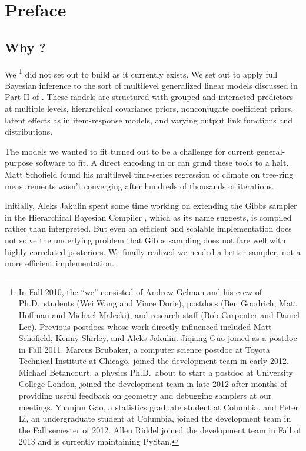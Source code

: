 \chapter*{Preface}

\section*{Why \Stan?}

We%
%
\footnote{In Fall 2010, the ``we'' consisted of Andrew Gelman and his
  crew of Ph.D.\ students (Wei Wang and Vince Dorie), postdocs (Ben
  Goodrich, Matt Hoffman and Michael Malecki), and research staff (Bob
  Carpenter and Daniel Lee).  Previous postdocs whose work directly
  influenced \Stan included Matt Schofield, Kenny Shirley, and Aleks
  Jakulin.  Jiqiang Guo joined as a postdoc in Fall 2011.  Marcus
  Brubaker, a computer science postdoc at Toyota Technical Institute
  at Chicago, joined the development team in early 2012.  Michael
  Betancourt, a physics Ph.D.\ about to start a postdoc at University
  College London, joined the development team in late 2012 after
  months of providing useful feedback on geometry and debugging
  samplers at our meetings. Yuanjun Gao, a statistics graduate student at
  Columbia, and Peter Li, an undergraduate student at Columbia,
  joined the development team in the Fall semester of 2012.  Allen
  Riddel joined the development team in Fall of 2013 and is currently
  maintaining PyStan.}
%
did not set out to build \Stan as it currently exists.  We set out to
apply full Bayesian inference to the sort of multilevel generalized
linear models discussed in Part II of \citep{GelmanHill:2007}.  These
models are structured with grouped and interacted predictors at
multiple levels, hierarchical covariance priors, nonconjugate
coefficient priors, latent effects as in item-response models, and
varying output link functions and distributions.

The models we wanted to fit turned out to be a challenge for current
general-purpose software to fit.  A direct encoding in \BUGS or \JAGS
can grind these tools to a halt.  Matt Schofield found his multilevel
time-series regression of climate on tree-ring measurements wasn't
converging after hundreds of thousands of iterations.

Initially, Aleks Jakulin spent some time working on extending the
Gibbs sampler in the Hierarchical Bayesian Compiler
\citep{DaumeIII:2007}, which as its name suggests, is compiled rather
than interpreted.  But even an efficient and scalable implementation
does not solve the underlying problem that Gibbs sampling does not
fare well with highly correlated posteriors.  We finally realized we
needed a better sampler, not a more efficient implementation.

